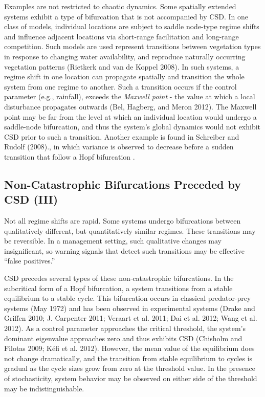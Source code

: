 \documentclass[author-year, review]{elsarticle} %
\begin{document}
Examples are not restricted to chaotic dynamics. Some spatially extended
systems exhibit a type of bifurcation that is not accompanied by CSD. In
one class of models, individual locations are subject to saddle
node-type regime shifts and influence adjacent locations via short-range
facilitation and long-range competition. Such models are used represent
transitions between vegetation types in response to changing water
availability, and reproduce naturally occurring vegetation patterns
(Rietkerk and van de Koppel 2008). In such systems, a regime shift in
one location can propagate spatially and transition the whole system
from one regime to another. Such a transition occurs if the control
parameter (e.g., rainfall), exceeds the \emph{Maxwell point} - the value
at which a local disturbance propagates outwards (Bel, Hagberg, and
Meron 2012). The Maxwell point may be far from the level at which an
individual location would undergo a saddle-node bifurcation, and thus
the system's global dynamics would not exhibit CSD prior to such a
transition. Another example is found in Schreiber and Rudolf (2008)., in
which variance is observed to decrease before a sudden transition that
follow a Hopf bifurcation .

\subsection{Non-Catastrophic Bifurcations Preceded by CSD (III)}

Not all regime shifts are rapid. Some systems undergo bifurcations
between qualitatively different, but quantitatively similar regimes.
These transitions may be reversible. In a management setting, such
qualitative changes may insignificant, so warning signals that detect
such transitions may be effective ``false positives.''

CSD precedes several types of these non-catastrophic bifurcations. In
the subcritical form of a Hopf bifurcation, a system transitions from a
stable equilibrium to a stable cycle. This bifurcation occurs in
classical predator-prey systems (May 1972) and has been observed in
experimental systems (Drake and Griffen 2010; J. Carpenter 2011; Veraart
et al. 2011; Dai et al. 2012; Wang et al. 2012). As a control parameter
approaches the critical threshold, the system's dominant eigenvalue
approaches zero and thus exhibits CSD (Chisholm and Filotas 2009; Kéfi
et al. 2012). However, the mean value of the equilibrium does not change
dramatically, and the transition from stable equilibrium to cycles is
gradual as the cycle sizes grow from zero at the threshold value. In the
presence of stochasticity, system behavior may be observed on either
side of the threshold may be indistinguishable.
\end{document}
